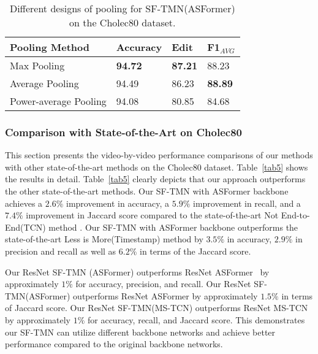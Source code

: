 \documentclass[sn-mathphys,Numbered]{sn-jnl}
\theoremstyle{thmstyleone}\newtheorem{theorem}{Theorem}\newtheorem{proposition}[theorem]{Proposition}
\theoremstyle{thmstyletwo}\newtheorem{example}{Example}\newtheorem{remark}{Remark}
\theoremstyle{thmstylethree}\newtheorem{definition}{Definition}
\begin{document}
\begin{table}[h]
\centering
\caption{Different designs of pooling for SF-TMN(ASFormer) on the Cholec80 dataset.}\label{tab3r}
\begin{tabular}{llll}
\hline
Pooling Method & Accuracy & Edit & F1$_{AVG}$\\
\hline
Max Pooling &  \textbf{94.72} & \textbf{87.21} &  88.23 \\
Average Pooling &  94.49 & 86.23 &  \textbf{88.89} \\
Power-average Pooling &  94.08 &  80.85 & 84.68 \\

\hline
\end{tabular}
\end{table}


\subsubsection{Comparison with State-of-the-Art on Cholec80}
This section presents the video-by-video performance comparisons of our methods with other state-of-the-art methods on the Cholec80 dataset. Table~\ref{tab5} shows the results in detail. Table~\ref{tab5} clearly depicts that our approach outperforms the other state-of-the-art methods. Our SF-TMN with ASFormer backbone achieves a $2.6\%$ improvement in accuracy, a $5.9\%$ improvement in recall, and a $7.4\%$ improvement in Jaccard score compared to the state-of-the-art Not End-to-End(TCN) method \cite{yi2022not}. Our SF-TMN with ASFormer backbone outperforms the state-of-the-art Less is More(Timestamp) \cite{wang2022less} method by $3.5\%$ in accuracy, $2.9\%$ in precision and recall as well as $6.2\%$ in terms of the Jaccard score.

Our ResNet SF-TMN (ASFormer) outperforms ResNet ASFormer~\cite{yi2021asformer,zhang2022surgicala} by approximately $1\%$ for accuracy, precision, and recall. Our ResNet SF-TMN(ASFormer) outperforms ResNet ASFormer by approximately $1.5\%$ in terms of Jaccard score. Our ResNet SF-TMN(MS-TCN) outperforms ResNet MS-TCN~\cite{farha2019ms} by approximately $1\%$ for accuracy, recall, and Jaccard score. This demonstrates our SF-TMN can utilize different backbone networks and achieve better performance compared to the original backbone networks.
\end{document}
